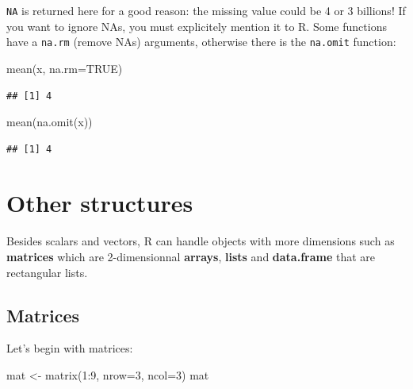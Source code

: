 \documentclass[
]{book}
\newenvironment{Shaded}{\begin{snugshade}}{\end{snugshade}}
\newcommand{\AttributeTok}[1]{\textcolor[rgb]{0.77,0.63,0.00}{#1}}
\newcommand{\ConstantTok}[1]{\textcolor[rgb]{0.00,0.00,0.00}{#1}}
\newcommand{\DecValTok}[1]{\textcolor[rgb]{0.00,0.00,0.81}{#1}}
\newcommand{\FunctionTok}[1]{\textcolor[rgb]{0.00,0.00,0.00}{#1}}
\newcommand{\NormalTok}[1]{#1}
\newcommand{\OtherTok}[1]{\textcolor[rgb]{0.56,0.35,0.01}{#1}}
\newcommand{\SpecialCharTok}[1]{\textcolor[rgb]{0.00,0.00,0.00}{#1}}
\begin{document}
\texttt{NA} is returned here for a good reason: the missing value could be 4 or 3 billions! If you want to ignore NAs, you must explicitely mention it to R. Some functions have a \texttt{na.rm} (remove NAs) arguments, otherwise there is the \texttt{na.omit} function:

\begin{Shaded}
\begin{Highlighting}[]
\FunctionTok{mean}\NormalTok{(x, }\AttributeTok{na.rm=}\ConstantTok{TRUE}\NormalTok{)}
\end{Highlighting}
\end{Shaded}

\begin{verbatim}
## [1] 4
\end{verbatim}

\begin{Shaded}
\begin{Highlighting}[]
\FunctionTok{mean}\NormalTok{(}\FunctionTok{na.omit}\NormalTok{(x))}
\end{Highlighting}
\end{Shaded}

\begin{verbatim}
## [1] 4
\end{verbatim}

\hypertarget{other-structures}{%
\section{Other structures}\label{other-structures}}

Besides scalars and vectors, R can handle objects with more dimensions such as \textbf{matrices} which are 2-dimensionnal \textbf{arrays}, \textbf{lists} and \textbf{data.frame} that are rectangular lists.

\hypertarget{matrices}{%
\subsection{Matrices}\label{matrices}}

Let's begin with matrices:

\begin{Shaded}
\begin{Highlighting}[]
\NormalTok{mat }\OtherTok{\textless{}{-}} \FunctionTok{matrix}\NormalTok{(}\DecValTok{1}\SpecialCharTok{:}\DecValTok{9}\NormalTok{, }\AttributeTok{nrow=}\DecValTok{3}\NormalTok{, }\AttributeTok{ncol=}\DecValTok{3}\NormalTok{)}
\NormalTok{mat}
\end{Highlighting}
\end{Shaded}
\end{document}
